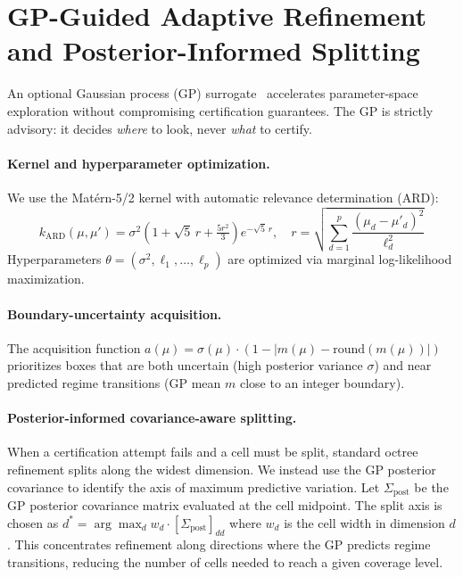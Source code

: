 \documentclass[11pt]{article}
\begin{document}
\section{GP-Guided Adaptive Refinement and Posterior-Informed Splitting}
\label{sec:gp}

An optional Gaussian process (GP) surrogate~\cite{rasmussen2006} accelerates parameter-space exploration without compromising certification guarantees.
The GP is strictly advisory: it decides \emph{where} to look, never \emph{what} to certify.

\paragraph{Kernel and hyperparameter optimization.}
We use the Mat\'ern-5/2 kernel with automatic relevance determination (ARD):
\[
k_{\mathrm{ARD}}(\mu, \mu') = \sigma^2 \!\left(1 + \sqrt{5}\,r + \tfrac{5r^2}{3}\right) e^{-\sqrt{5}\,r}, \quad r = \sqrt{\textstyle\sum_{d=1}^p \frac{(\mu_d - \mu'_d)^2}{\ell_d^2}}
\]
Hyperparameters $\theta = (\sigma^2, \ell_1, \ldots, \ell_p)$ are optimized via marginal log-likelihood maximization.

\paragraph{Boundary-uncertainty acquisition.}
The acquisition function $a(\mu) = \sigma(\mu) \cdot (1 - |m(\mu) - \mathrm{round}(m(\mu))|)$ prioritizes boxes that are both uncertain (high posterior variance $\sigma$) and near predicted regime transitions (GP mean $m$ close to an integer boundary).

\paragraph{Posterior-informed covariance-aware splitting.}
When a certification attempt fails and a cell must be split, standard octree refinement splits along the widest dimension.
We instead use the GP posterior covariance to identify the axis of maximum predictive variation.
Let $\Sigma_{\mathrm{post}}$ be the GP posterior covariance matrix evaluated at the cell midpoint.
The split axis is chosen as $d^* = \arg\max_d w_d \cdot [\Sigma_{\mathrm{post}}]_{dd}$ where $w_d$ is the cell width in dimension $d$.
This concentrates refinement along directions where the GP predicts regime transitions, reducing the number of cells needed to reach a given coverage level.
\end{document}
